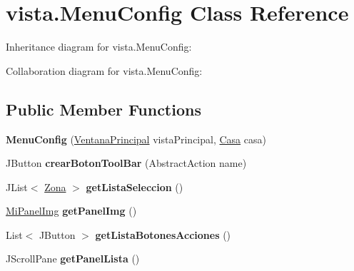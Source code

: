 \hypertarget{classvista_1_1_menu_config}{}\section{vista.\+Menu\+Config Class Reference}
\label{classvista_1_1_menu_config}


Inheritance diagram for vista.\+Menu\+Config\+:


Collaboration diagram for vista.\+Menu\+Config\+:
\subsection*{Public Member Functions}
\begin{DoxyCompactItemize}
\item 
\mbox{\label{classvista_1_1_menu_config_a8816357996dfe08ce3e7e2f1a140676f}} 
{\bfseries Menu\+Config} (\mbox{\hyperlink{classvista_1_1_ventana_principal}{Ventana\+Principal}} vista\+Principal, \mbox{\hyperlink{classmodelo_1_1_casa}{Casa}} casa)
\item 
\mbox{\label{classvista_1_1_menu_config_a67a67d59622932be75d810d984872be0}} 
J\+Button {\bfseries crear\+Boton\+Tool\+Bar} (Abstract\+Action name)
\item 
\mbox{\label{classvista_1_1_menu_config_aa025274f7663f42bae01619ad9cb2608}} 
J\+List$<$ \mbox{\hyperlink{classmodelo_1_1_zona}{Zona}} $>$ {\bfseries get\+Lista\+Seleccion} ()
\item 
\mbox{\label{classvista_1_1_menu_config_a750880517f79d71e51129f20b78f149d}} 
\mbox{\hyperlink{classvista_1_1_mi_panel_img}{Mi\+Panel\+Img}} {\bfseries get\+Panel\+Img} ()
\item 
\mbox{\label{classvista_1_1_menu_config_afe98141e06e8626e4ade8b9d5f04155f}} 
List$<$ J\+Button $>$ {\bfseries get\+Lista\+Botones\+Acciones} ()
\item 
\mbox{\label{classvista_1_1_menu_config_a4c3eef77fde182cbf4af1b9d3025424c}} 
J\+Scroll\+Pane {\bfseries get\+Panel\+Lista} ()
\item 
\mbox{\label{classvista_1_1_menu_config_a0ebbf9d5ec630071ee53b2b0cdbc52ef}} 

\end{DoxyCompactItemize}
